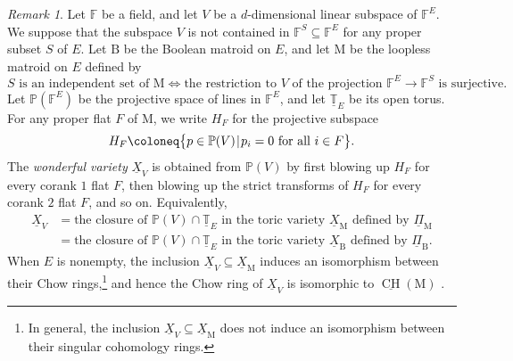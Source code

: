 \documentclass[11pt,reqno]{amsart}
\theoremstyle{definition}
\theoremstyle{remark}
\newtheorem{remark}[theorem]{Remark}
\renewcommand{\(}{\left(}
\renewcommand{\)}{\right)}
\newcommand{\<}{\left<}
\renewcommand{\>}{\right>}
\newcommand{\CH}{\operatorname{CH}}
\renewcommand{\mid}{\hspace{0.3mm}|\hspace{0.3mm}}
\begin{document}
\begin{remark}\label{remark:wonderful}
Let $\mathbb{F}$ be a field,
and let $V$ be a $d$-dimensional linear subspace of $\mathbb{F}^E$.
We suppose that
the subspace $V$ is not contained in $\mathbb{F}^S \subseteq\mathbb{F}^E$
 for any proper subset $S$ of $E$.
Let $\mathrm{B}$ be the Boolean matroid on $E$,
and let  $\mathrm{M}$ be the loopless matroid on $E$ defined by
\[
\text{$S$ is an independent set of $\mathrm{M}$} \Longleftrightarrow
\text{the restriction to $V$ of the projection $\mathbb{F}^E \to \mathbb{F}^S$  is surjective}. %
\]
Let $\mathbb{P}(\mathbb{F}^E)$ be the projective space of lines in $\mathbb{F}^E$, 
and let $\underline{\mathbb{T}}_E$ be its open torus. %
For any  proper flat $F$ of $\mathrm{M}$, we write  $H_F$ for the projective subspace
\[
H_F \coloneq \big\{ p\in \mathbb{P}(V)\mid \text{$p_i = 0$ for all $i\in F$} \big\}.
\]  
The  \emph{wonderful variety} $\underline{X}_V$ is obtained from $\mathbb{P}(V)$ by first blowing up $H_F$ for every corank $1$ flat $F$, 
then blowing up the strict transforms of $H_F$ for every corank $2$ flat $F$, and so on.
Equivalently, 
\begin{align*}
\underline{X}_V&=\text{the closure of $\mathbb{P}(V) \cap \underline{\mathbb{T}}_E$ in the toric variety $\underline{X}_\mathrm{M}$ defined by $\underline{\Pi}_\mathrm{M}$}\\
&=\text{the closure of $\mathbb{P}(V) \cap \underline{\mathbb{T}}_E$ in the toric variety $\underline{X}_\mathrm{B}$ defined by $\underline{\Pi}_\mathrm{B}$}.
\end{align*}
When $E$ is nonempty, the inclusion $\underline{X}_V \subseteq \underline{X}_\mathrm{M}$ induces an isomorphism between their Chow rings,\footnote{In general, the inclusion $\underline{X}_V \subseteq \underline{X}_\mathrm{M}$ does not induce an isomorphism between their singular cohomology rings.}
and hence  the Chow ring of $\underline{X}_V$ is isomorphic to $\underline{\CH}(\mathrm{M})$ \cite[Corollary 2]{FY}.


\end{remark}
\end{document}
